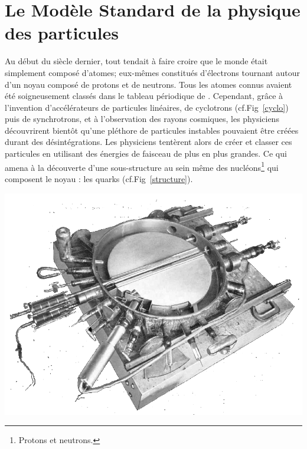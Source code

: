 \section{Le Modèle Standard de la physique des particules}
 
Au début du siècle dernier, tout tendait à faire croire que le monde était simplement composé d'atomes; eux-mêmes constitués d'électrons tournant autour d'un noyau composé de protons et de neutrons. Tous les atomes connus avaient été soigneusement classés dans le tableau périodique de . Cependant, grâce à l'invention d'accélérateurs de particules linéaires, de cyclotrons (cf.Fig~\ref{cyclo}) puis de synchrotrons, et à l'observation des rayons cosmiques, les physiciens découvrirent bientôt qu'une pléthore de particules instables pouvaient être créées durant des désintégrations. Les physiciens tentèrent alors de créer et classer ces particules en utilisant des énergies de faisceau de plus en plus grandes. Ce qui amena à la découverte d'une sous-structure au sein même des nucléons\footnote{Protons et neutrons.} qui composent le noyau : les quarks (cf.Fig~\ref{structure}).
\marginpar
{
	\includegraphics[width=\marginparwidth]{SM/cyclotron.png}
    \captionsetup{type=figure}\caption{Cyclotron de \num{27} pouces, accélérateur de $^{2}$H à \SI{4}{\mega\eV} (Université de Berkeley, \num{1932}).}
    \label{cyclo}
}

